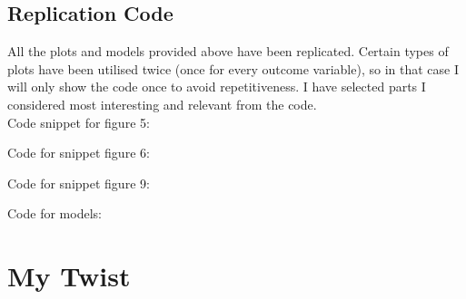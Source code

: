\documentclass[12pt,letterpaper]{article}
\begin{document}
		\subsection*{Replication Code}
		All the plots and models provided above have been replicated. Certain types of plots have been utilised twice (once for every outcome variable), so in that case I will only show the code once to avoid repetitiveness. I have selected parts I considered most interesting and relevant from the code. \\[.2cm]
		Code snippet for figure 5: 
		 
		 
		\vspace{.25cm}
		Code for snippet figure 6:
		
		\newpage 
		\noindent Code for snippet figure 9: 
		
		
		\vspace{.25cm}
		Code for models: 
		 
		 
		\newpage
	\section*{My Twist}
\end{document}
